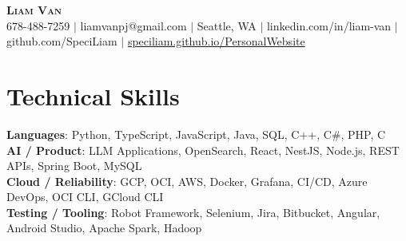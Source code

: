 \documentclass[letterpaper,11pt]{article}
\begin{document}

%
\begin{center}
    \textbf{\Huge \scshape Liam Van} \\ \vspace{1pt}
    \small 678-488-7259 $|$ \small {liamvanpj@gmail.com} $|$ Seattle, WA
 {{$|$ linkedin.com/in/liam-van} {$|$ github.com/SpeciLiam} {$|$ \href{https://speciliam.github.io/PersonalWebsite}{speciliam.github.io/PersonalWebsite}}}

\end{center}

\section{Technical Skills}
 \begin{itemize}[leftmargin=0.15in, label={}]
    \small{\item{
     \textbf{Languages}{: Python, TypeScript, JavaScript, Java, SQL, C++, C\#, PHP, C} \\
     \textbf{AI / Product}{: LLM Applications, OpenSearch, React, NestJS, Node.js, REST APIs, Spring Boot, MySQL} \\
     \textbf{Cloud / Reliability}{: GCP, OCI, AWS, Docker, Grafana, CI/CD, Azure DevOps, OCI CLI, GCloud CLI} \\
     \textbf{Testing / Tooling}{: Robot Framework, Selenium, Jira, Bitbucket, Angular, Android Studio, Apache Spark, Hadoop} \\
    }}
 \end{itemize}
%
\end{document}
